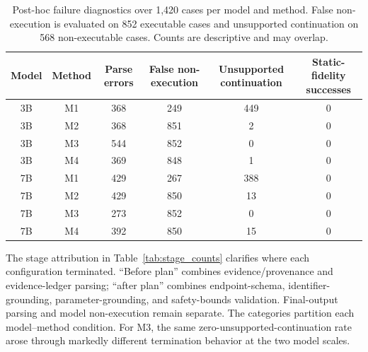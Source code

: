 \documentclass{article}
\newcommand{\Mone}{\textsc{M1}\xspace}
\newcommand{\Mtwo}{\textsc{M2}\xspace}
\newcommand{\Mthree}{\textsc{M3}\xspace}
\newcommand{\Mfour}{\textsc{M4}\xspace}
\begin{document}
\begin{table}[t]
\caption{Post-hoc failure diagnostics over 1,420 cases per model and method.
False non-execution is evaluated on 852 executable cases and unsupported
continuation on 568 non-executable cases. Counts are descriptive and may
overlap.}
\label{tab:failure_counts}
\centering
\footnotesize
\setlength{\tabcolsep}{8pt}
\begin{tabular}{@{}cccccc@{}}
\toprule
Model & Method & Parse errors & False non-execution & Unsupported continuation & Static-fidelity successes \\
\midrule
3B & \Mone & 368 & 249 & 449 & 0 \\
3B & \Mtwo & 368 & 851 & 2 & 0 \\
3B & \Mthree & 544 & 852 & 0 & 0 \\
3B & \Mfour & 369 & 848 & 1 & 0 \\
7B & \Mone & 429 & 267 & 388 & 0 \\
7B & \Mtwo & 429 & 850 & 13 & 0 \\
7B & \Mthree & 273 & 852 & 0 & 0 \\
7B & \Mfour & 392 & 850 & 15 & 0 \\
\bottomrule
\end{tabular}
\end{table}

The stage attribution in Table~\ref{tab:stage_counts} clarifies where each
configuration terminated. ``Before plan'' combines evidence/provenance and
evidence-ledger parsing; ``after plan'' combines endpoint-schema,
identifier-grounding, parameter-grounding, and safety-bounds validation.
Final-output parsing and model non-execution remain separate. The categories
partition each model--method condition. For \Mthree, the same
zero-unsupported-continuation rate arose through markedly different
termination behavior at the two model scales.
\end{document}
